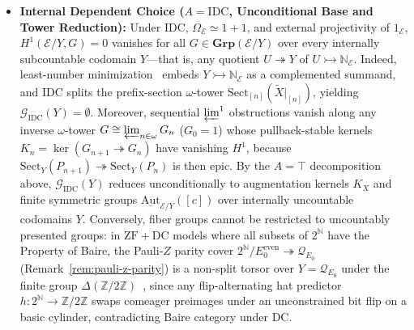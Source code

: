 \begin{itemize}
  \item \textbf{Internal Dependent Choice ($A = \mathrm{IDC}$, Unconditional Base and Tower Reduction):} Under $\mathrm{IDC}$, $\Omega_{\mathcal{E}} \simeq 1+1$, and external projectivity of $1_{\mathcal{E}}$, $H^1(\mathcal{E}/Y, G) = 0$ vanishes for all $G \in \mathbf{Grp}(\mathcal{E}/Y)$ over every internally subcountable codomain $Y$---that is, any quotient $U \twoheadrightarrow Y$ of $U \rightarrowtail \mathbb{N}_{\mathcal{E}}$. Indeed, least-number minimization~\cite[\S D5.1]{Johnstone02} embeds $Y \rightarrowtail \mathbb{N}_{\mathcal{E}}$ as a complemented summand, and $\mathrm{IDC}$ splits the prefix-section $\omega$-tower $\mathrm{Sect}_{[n]}(\widetilde{X}|_{[n]})$, yielding $\mathcal{G}_{\mathrm{IDC}}(Y) = \emptyset$. Moreover, sequential $\varprojlim^1$ obstructions vanish along any inverse $\omega$-tower $G \cong \varprojlim_{n \in \omega} G_n$ ($G_0 = 1$) whose pullback-stable kernels $K_n = \ker(G_{n+1} \twoheadrightarrow G_n)$ have vanishing $H^1$, because $\mathrm{Sect}_Y(P_{n+1}) \twoheadrightarrow \mathrm{Sect}_Y(P_n)$ is then epic. By the $A = \top$ decomposition above, $\mathcal{G}_{\mathrm{IDC}}(Y)$ reduces unconditionally to augmentation kernels $K_X$ and finite symmetric groups $\underline{\mathrm{Aut}}_{\mathcal{E}/Y}([c])$ over internally uncountable codomains $Y$. Conversely, fiber groups cannot be restricted to uncountably presented groups: in $\mathrm{ZF} + \mathrm{DC}$ models where all subsets of $2^{\mathbb{N}}$ have the Property of Baire, the Pauli-$Z$ parity cover $2^{\mathbb{N}}/E_0^{\mathrm{even}} \twoheadrightarrow \mathcal{Q}_{E_0}$ (Remark~\ref{rem:pauli-z-parity}) is a non-split torsor over $Y = \mathcal{Q}_{E_0}$ under the finite group $\Delta(\mathbb{Z}/2\mathbb{Z})$~\cite{Serafin23}, since any flip-alternating hat predictor $h : 2^{\mathbb{N}} \to \mathbb{Z}/2\mathbb{Z}$ swaps comeager preimages under an unconstrained bit flip on a basic cylinder, contradicting Baire category under $\mathrm{DC}$.


\end{itemize}
